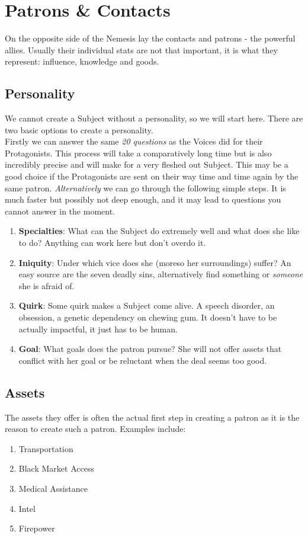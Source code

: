 \documentclass[12pt,a4paper,openany,usenames,dvipsnames]{book}
\begin{document}
	\chapter{Patrons \& Contacts}
	On the opposite side of the Nemesis lay the contacts and patrons - the powerful allies. Usually their individual stats are not that important, it is what they represent: influence, knowledge and goods.
	\section*{Personality}
	We cannot create a Subject without a personality, so we will start here.
	There are two basic options to create a personality.\\
	Firstly we can answer the same \emph{20 questions} as the Voices did for their Protagonists.
	This process will take a comparatively long time
		but is also incredibly precise and will make for a very fleshed out Subject.
	This may be a good choice if the Protagonists are sent on their way time and time again by the same patron.
	\emph{Alternatively} we can go through the following simple steps.
	It is much faster but possibly not deep enough, and it may lead to questions you cannot answer in the moment.
	\begin{enumerate}
		\setlength\itemsep{-8mm} \vspace{-8mm}
		\item \textbf{Specialties}: What can the Subject do extremely well and what does she like to do?
			Anything can work here but don't overdo it.
		\item \textbf{Iniquity}: Under which vice does she (moreso her surroundings) suffer? An easy source are the seven deadly sins, alternatively find something or \emph{someone} she is afraid of.
		\item \textbf{Quirk}: Some quirk makes a Subject come alive.
			A speech disorder, an obsession, a genetic dependency on chewing gum.
			It doesn't have to be actually impactful, it just has to be human.
		\item \textbf{Goal}: What goals does the patron pursue? She will not offer assets that conflict with her goal or be reluctant when the deal seems too good.
	\end{enumerate}
	\section*{Assets}
	The assets they offer is often the actual first step in creating a patron as it is the reason to create such a patron. Examples include:
	\begin{enumerate}
		\setlength\itemsep{-8mm} \vspace{-8mm}
		\item Transportation
		\item Black Market Access
		\item Medical Assistance
		\item Intel
		\item Firepower
	\end{enumerate}
\end{document}
